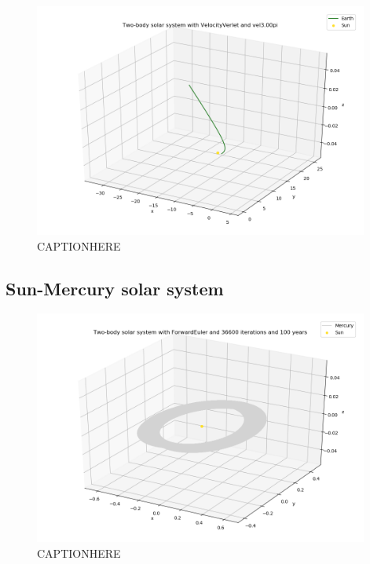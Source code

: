 \documentclass{article}
\begin{document}
    \begin{figure}[H]
        \centering
        \includegraphics[width = 11cm]{img/plot3D_S_E_V_vel300pi.png}
        \caption{CAPTIONHERE}
        \label{fig:plot3D_S_E_V_vel300pi}
    \end{figure}



\subsection{Sun-Mercury solar system}

    \begin{figure}[H]
        \centering
        \includegraphics[width = 11cm]{img/plot3D_S_M_F_n36600_yr100.png}
        \caption{CAPTIONHERE}
        \label{fig:plot3D_S_M_F_n36600_yr100}
    \end{figure}
\end{document}
